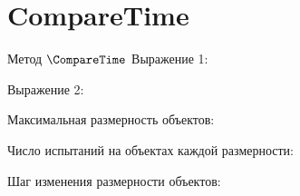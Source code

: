 \section{CompareTime}
\begin{frame}{Метод $\CompareTime$}
	Выражение 1:


	Выражение 2:


	Максимальная размерность объектов:

	Число испытаний на объектах каждой размерности:

	Шаг изменения размерности объектов:



\end{frame}

